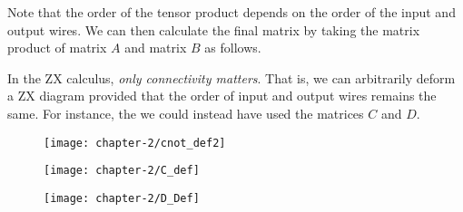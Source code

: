 Note that the order of the tensor product depends on the order of the input and output wires. We can then calculate the final matrix by taking the matrix product of matrix $A$ and matrix $B$ as follows.

\begin{figure}[H]
    \centering
\end{figure}

In the ZX calculus, \textit{only connectivity matters}. That is, we can arbitrarily deform a ZX diagram provided that the order of input and output wires remains the same. For instance, the we could instead have used the matrices $C$ and $D$.

\begin{figure}[H]
    \centering
    \texttt{[image: chapter-2/cnot\_def2]}
\end{figure}

\begin{figure}[H]
\centering
\begin{minipage}{.4\textwidth}
    \centering
    \texttt{[image: chapter-2/C\_def]}
\end{minipage}%
\begin{minipage}{.4\textwidth}
    \centering
    \texttt{[image: chapter-2/D\_Def]}
\end{minipage}
\end{figure}

